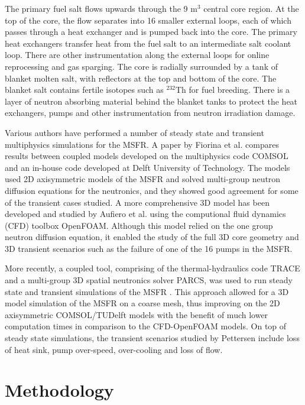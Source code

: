 \documentclass{anstrans}
\begin{document}
	The primary fuel salt flows upwards through the 9 m$^3$ central core
	region. At the top of the core, the flow separates into 16 smaller external
	loops, each of which passes through a heat exchanger and is pumped back
	into the core. The primary heat exchangers transfer heat from the fuel salt 
	to an intermediate salt coolant loop. There are other instrumentation along
	the external loops for online reprocessing and gas sparging. The core is
	radially surrounded by a tank of blanket molten salt, with reflectors at
	the top and bottom of the core. The blanket salt contains fertile isotopes
	such as $^{232}$Th for fuel breeding. There is a layer of neutron absorbing
	material behind the blanket tanks to protect the heat exchangers, pumps and
	other instrumentation from neutron irradiation damage.

	Various authors have performed a number of steady state and transient
	multiphysics simulations for the \gls{MSFR}. A paper by Fiorina et al.
	\cite{fiorina_modelling_2014} compares results between coupled models
	developed on the multiphysics code COMSOL and an in-house code developed at
	Delft University of Technology. The models used 2D axisymmetric models of
	the \gls{MSFR} and solved multi-group neutron diffusion equations for the
	neutronics, and they showed good agreement for some of the transient cases
	studied. A more comprehensive 3D model has been developed and studied by
	Aufiero et al. \cite{aufiero_development_2014} using the computional fluid
	dynamics (CFD) toolbox OpenFOAM. Although this model relied on the one
	group neutron diffusion equation, it enabled the study of the full 3D core
	geometry and 3D transient scenarios such as the failure of one of the 16
	pumps in the \gls{MSFR}.

	More recently, a coupled tool, comprising of the thermal-hydraulics code
	TRACE and a multi-group 3D spatial neutronics solver \gls{PARCS}, was
	used to run steady state and transient simulations of the \gls{MSFR}
	\cite{pettersen_coupled_2016}. This approach allowed for a 3D model
	simulation of the \gls{MSFR} on a coarse mesh, thus improving on the 2D
	axisymmetric COMSOL/TUDelft models with the benefit of much lower
	computation times in comparison to the CFD-OpenFOAM models. On top of
	steady state simulations, the transient scenarios studied by Pettersen
	\cite{pettersen_coupled_2016} include loss of heat sink, pump over-speed,
	over-cooling and loss of flow.

\section{Methodology}
\end{document}
